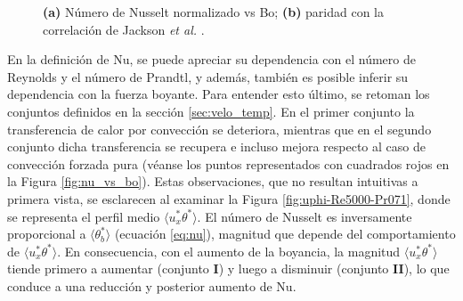 \begin{figure}[H]
  \centering
  \caption{\textbf{(a)} Número de Nusselt normalizado vs Bo; \textbf{(b)} paridad con la correlación de Jackson \textit{et al.} \cite{jackson1989studies}.}
  \label{fig:nusselt}
\end{figure}

En la definición de Nu, se puede apreciar su dependencia con el número de Reynolds y el número de Prandtl, y además, también es posible inferir su dependencia con la fuerza boyante. Para entender esto último, se retoman los conjuntos definidos en la sección \ref{sec:velo_temp}. En el primer conjunto la transferencia de calor por convección se deteriora, mientras que en el segundo conjunto dicha transferencia se recupera e incluso mejora respecto al caso de convección forzada pura (véanse los puntos representados con cuadrados rojos en la Figura \ref{fig:nu_vs_bo}). Estas observaciones, que no resultan intuitivas a primera vista, se esclarecen al examinar la Figura \ref{fig:uphi-Re5000-Pr071}, donde se representa el perfil medio $\langle u_x^{*}\theta^{*}\rangle$. El número de Nusselt es inversamente proporcional a $\langle\theta^{*}_b\rangle$ (ecuación \ref{eq:nu}), magnitud que depende del comportamiento de $\langle u_x^{*}\theta^{*}\rangle$. En consecuencia, con el aumento de la boyancia, la magnitud  $\langle u_x^{*}\theta^{*}\rangle$ tiende primero a aumentar (conjunto \textbf{I}) y luego a disminuir (conjunto \textbf{II}), lo que conduce a una reducción y posterior aumento de Nu. 

